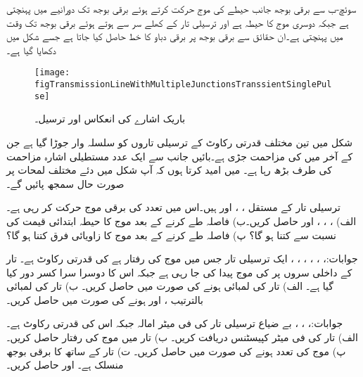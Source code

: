 سوئچ-ب سے برقی بوجھ جانب  حیطے کی موج حرکت کرتے ہوئے برقی بوجھ تک  دورانیے میں پہنچتی ہے جبکہ دوسری موج کا حیطہ  ہے اور ترسیلی تار کے کھلے سر سے ہوتے ہوئے برقی بوجھ تک  وقت میں پہنچتی ہے۔ان حقائق سے برقی بوجھ پر برقی دباو کا خط حاصل کیا جاتا ہے جسے شکل  میں دکھایا گیا ہے۔

\begin{figure}
\centering
\texttt{[image: figTransmissionLineWithMultipleJunctionsTranssientSinglePulse]}
\caption{باریک اشارے کی انعکاس اور ترسیل۔}
\label{شکل_ترسیلی_تار_باریک_اشارے_کی_انعکاس}
\end{figure}

شکل  میں تین مختلف قدرتی رکاوٹ کے ترسیلی تاروں کو سلسلہ وار جوڑا گیا ہے جن کے آخر میں  کی مزاحمت جڑی ہے۔بائیں جانب سے ایک عدد مستطیلی اشارہ مزاحمت کی طرف بڑھ رہا ہے۔ میں امید کرتا ہوں کہ آپ شکل میں دئے مختلف لمحات پر صورت حال سمجھ پائیں گے۔
\newpage
{}

ترسیلی تار کے مستقل ، ،  اور  ہیں۔اس میں  تعدد کی برقی موج حرکت کر رہی ہے۔ الف) ، ، ،  اور  حاصل کریں۔ب)   فاصلہ طے کرنے کے بعد موج کا حیطہ ابتدائی قیمت کی نسبت سے کتنا ہو گا؟ پ)  فاصلہ طے کرنے کے بعد موج کا زاویائی فرق کتنا ہو گا؟ 

جوابات:، ، ، ، ، ، 
ایک ترسیلی تار جس میں موج کی رفتار  ہے کی قدرتی رکاوٹ  ہے۔ تار کے داخلی سروں پر  کی موج پیدا کی جا رہی ہے جبکہ اس کا دوسرا سرا کسر دور کیا گیا ہے۔ الف) تار کی لمبائی  ہونے کی صورت میں  حاصل کریں۔ ب) تار کی لمبائی بالترتیب ،  اور  ہونے کی صورت میں  حاصل کریں۔

جوابات:، ، ،  
بے ضیاع ترسیلی تار کی فی میٹر امالہ  جبکہ اس کی قدرتی رکاوٹ  ہے۔الف) تار کی فی میٹر کپیسٹنس دریافت کریں۔ ب) تار میں موج کی رفتار حاصل کریں۔ پ) موج کی تعدد  ہونے کی صورت میں  حاصل کریں۔ ت) تار کے ساتھ  کا برقی بوجھ منسلک ہے۔  اور  حاصل کریں۔

